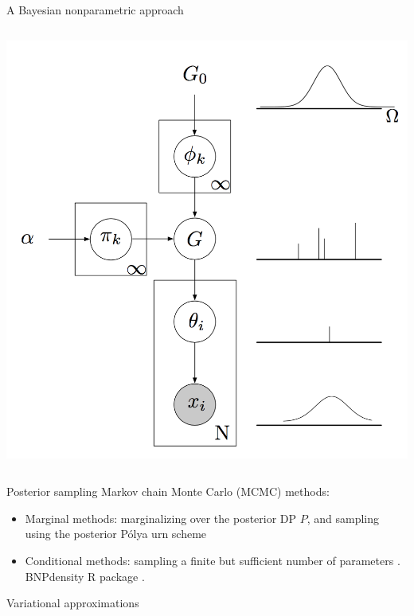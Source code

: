 \begin{frame}{A {Bayesian nonparametric} approach}
\begin{columns}
\begin{center}
		\includegraphics[height=.4\textheight]{figures_julyan/mixtures/plate_SB_mixture}
\end{center}
\end{columns}
\end{frame}



\begin{frame}{Posterior sampling}
Markov chain Monte Carlo (MCMC) methods:
\begin{itemize}
\item \alert{Marginal methods}: marginalizing over the posterior DP $P$, and sampling using the posterior P\'olya urn scheme \citep[easy in conjugate case, see][]{neal2000markov}
\item \alert{Conditional methods}: sampling a finite but sufficient number of parameters
 \citep{ishwaran2001gibbs}. \alert{BNPdensity} R package \citep{arbel2021BNPdensity}.
\end{itemize}
Variational approximations \citep{blei2006variational}
\end{frame}



